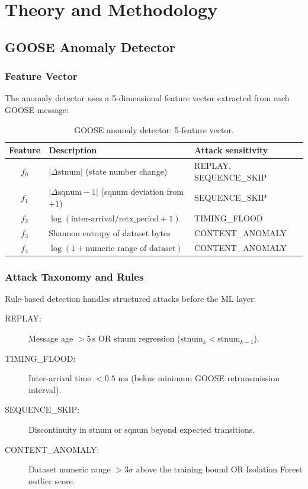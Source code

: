 \documentclass[11pt, a4paper]{article}
\newcommand{\ms}{\,\text{ms}}
\begin{document}
\section{Theory and Methodology}
\label{sec:theory}

\subsection{GOOSE Anomaly Detector}

\subsubsection{Feature Vector}

The anomaly detector uses a 5-dimensional feature vector extracted from
each GOOSE message:

\begin{table}[ht]
\centering
\caption{GOOSE anomaly detector: 5-feature vector.}
\label{tab:features}
\begin{tabular}{cll}
\toprule
Feature & Description & Attack sensitivity \\
\midrule
$f_0$ & $|\Delta\text{stnum}|$ (state number change) & REPLAY, SEQUENCE\_SKIP \\
$f_1$ & $|\Delta\text{sqnum} - 1|$ (sqnum deviation from $+1$) & SEQUENCE\_SKIP \\
$f_2$ & $\log(\text{inter-arrival}/\text{retx\_period} + 1)$ & TIMING\_FLOOD \\
$f_3$ & Shannon entropy of dataset bytes & CONTENT\_ANOMALY \\
$f_4$ & $\log(1 + \text{numeric range of dataset})$ & CONTENT\_ANOMALY \\
\bottomrule
\end{tabular}
\end{table}

\subsubsection{Attack Taxonomy and Rules}

Rule-based detection handles structured attacks before the ML layer:

\begin{description}
  \item[REPLAY:] Message age $> 5\,\text{s}$ OR stnum regression
    ($\text{stnum}_k < \text{stnum}_{k-1}$).
  \item[TIMING\_FLOOD:] Inter-arrival time $< 0.5\,\ms$ (below minimum
    GOOSE retransmission interval).
  \item[SEQUENCE\_SKIP:] Discontinuity in stnum or sqnum beyond expected
    transitions.
  \item[CONTENT\_ANOMALY:] Dataset numeric range $> 3\sigma$ above the
    training bound OR Isolation Forest outlier score.
\end{description}
\end{document}
